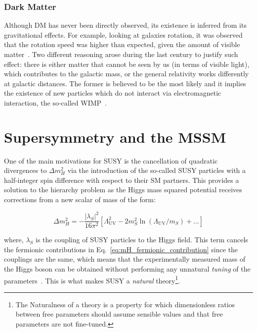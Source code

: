 		\subsubsection*{Dark Matter}

			Although \ac{DM} has never been directly observed, its existence is inferred from its gravitational effects. For example, looking at galaxies rotation, it was observed that the rotation speed was higher than expected, given the amount of visible matter~\cite{Rubin1970}. Two different reasoning arose during the last century to justify such effect: there is either matter that cannot be seen by us (in terms of visible light), which contributes to the galactic mass, or the general relativity works differently at galactic distances. The former is believed to be the most likely and it implies the existence of new particles which do not interact via electromagnetic interaction, the so-called \ac{WIMP}~\cite{oro44361}.







	\section{Supersymmetry and the MSSM}
	\label{sec:SUSY}



		One of the main motivations for \ac{SUSY} is the cancellation of quadratic divergences to $\Delta m_H^2$ via the introduction of the so-called \ac{SUSY} particles with a half-integer spin difference with respect to their \ac{SM} partners. This provides a solution to the hierarchy problem as the Higgs mass squared potential receives corrections from a new scalar of mass of the form:

		\begin{equation}
		\label{eq:mH_scalar_contribution}
			\Delta m_H^2 = - \frac{\left | \lambda_S \right |^2}{16 \pi ^2} \left [  \Lambda_{\mathrm{UV}}^2 - 2m_S^2 \ln \left (\Lambda_{\mathrm{UV}} / m_S \right) + \dots \right ]
		\end{equation}

		\noindent where, $\lambda_S$ is the coupling of \ac{SUSY} particles to the Higgs field. This term cancels the fermionic contributions in Eq.~\ref{eq:mH_fermionic_contribution} since the couplings are the same, which means that the experimentally measured mass of the Higgs boson can be obtained without performing any unnatural \emph{tuning} of the parameters~\cite{susyprimer,Barbieri:1987fn}. This is what makes \ac{SUSY} a \emph{natural} theory\footnote{The Naturalness of a theory is a property for which dimensionless ratios between free parameters should assume sensible values and that free parameters are not fine-tuned.}.

